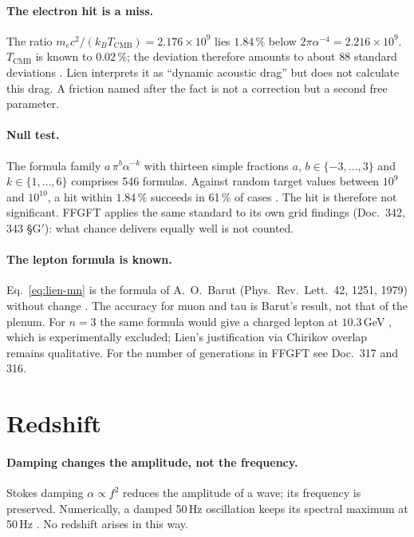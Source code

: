 \paragraph{The electron hit is a miss.}
The ratio $m_ec^2/(k_BT_\text{CMB})=2.176\times10^9$ lies $1.84\,\%$ below
$2\pi\alpha^{-4}=2.216\times10^9$. $T_\text{CMB}$ is known to $0.02\,\%$; the
deviation therefore amounts to about 88 standard deviations \KM. Lien
interprets it as \enquote{dynamic acoustic drag} but does not calculate this
drag. A friction named after the fact is not a correction but a second free
parameter.

\paragraph{Null test.}
The formula family $a\,\pi^b\alpha^{-k}$ with thirteen simple fractions $a$,
$b\in\{-3,\dots,3\}$ and $k\in\{1,\dots,6\}$ comprises 546 formulas. Against
random target values between $10^9$ and $10^{10}$, a hit within $1.84\,\%$
succeeds in 61\,\% of cases \KM. The hit is therefore not significant. FFGFT
applies the same standard to its own grid findings (Doc.~342, 343 §G$'$):
what chance delivers equally well is not counted.

\paragraph{The lepton formula is known.}
Eq.~\eqref{eq:lien-mn} is the formula of A.~O.~Barut (Phys.\ Rev.\ Lett.\
42, 1251, 1979) without change \BM. The accuracy for muon and tau is Barut's
result, not that of the plenum. For $n=3$ the same formula would give a
charged lepton at $10.3$\,GeV \KM, which is experimentally excluded; Lien's
justification via Chirikov overlap remains qualitative. For the number of
generations in FFGFT see Doc.~317 and 316.

\section{Redshift}

\paragraph{Damping changes the amplitude, not the frequency.}
Stokes damping $\alpha\propto f^2$ reduces the amplitude of a wave; its
frequency is preserved. Numerically, a damped 50\,Hz oscillation keeps its
spectral maximum at 50\,Hz \KM. No redshift arises in this way.

